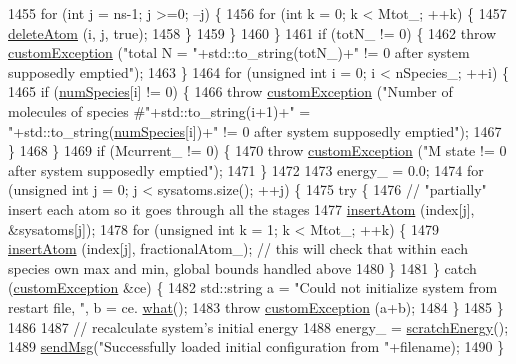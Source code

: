 \begin{DoxyCode}
1455         \textcolor{keywordflow}{for} (\textcolor{keywordtype}{int} j = ns-1; j >=0; --j) \{
1456             \textcolor{keywordflow}{for} (\textcolor{keywordtype}{int} k = 0; k < Mtot\_; ++k) \{
1457                 \hyperlink{classsim_system_acabf4fc5b5b90bba62e1449ddb3646c6}{deleteAtom} (i, j, \textcolor{keyword}{true});
1458             \}
1459         \}
1460     \}
1461     \textcolor{keywordflow}{if} (totN\_ != 0) \{
1462         \textcolor{keywordflow}{throw} \hyperlink{classcustom_exception}{customException} (\textcolor{stringliteral}{"total N = "}+std::to\_string(totN\_)+\textcolor{stringliteral}{" != 0 after system
       supposedly emptied"});
1463     \}
1464     \textcolor{keywordflow}{for} (\textcolor{keywordtype}{unsigned} \textcolor{keywordtype}{int} i = 0; i < nSpecies\_; ++i) \{
1465         \textcolor{keywordflow}{if} (\hyperlink{classsim_system_a9eea865e6dc1cff377b1e79c4d9c23f0}{numSpecies}[i] != 0) \{
1466             \textcolor{keywordflow}{throw} \hyperlink{classcustom_exception}{customException} (\textcolor{stringliteral}{"Number of molecules of species #"}+std::to\_string(i+1)+\textcolor{stringliteral}{"
       = "}+std::to\_string(\hyperlink{classsim_system_a9eea865e6dc1cff377b1e79c4d9c23f0}{numSpecies}[i])+\textcolor{stringliteral}{" != 0 after system supposedly emptied"});
1467         \}
1468     \}
1469     \textcolor{keywordflow}{if} (Mcurrent\_ != 0) \{
1470         \textcolor{keywordflow}{throw} \hyperlink{classcustom_exception}{customException} (\textcolor{stringliteral}{"M state != 0 after system supposedly emptied"});
1471     \}
1472 
1473     energy\_ = 0.0;
1474     \textcolor{keywordflow}{for} (\textcolor{keywordtype}{unsigned} \textcolor{keywordtype}{int} j = 0; j < sysatoms.size(); ++j) \{
1475         \textcolor{keywordflow}{try} \{
1476             \textcolor{comment}{// "partially" insert each atom so it goes through all the stages}
1477             \hyperlink{classsim_system_a0404e9435cc046d19b6bb990678ee069}{insertAtom} (index[j], &sysatoms[j]);
1478             \textcolor{keywordflow}{for} (\textcolor{keywordtype}{unsigned} \textcolor{keywordtype}{int} k = 1; k < Mtot\_; ++k) \{
1479                 \hyperlink{classsim_system_a0404e9435cc046d19b6bb990678ee069}{insertAtom} (index[j], fractionalAtom\_); \textcolor{comment}{// this will check that within each
       species own max and min, global bounds handled above}
1480             \}
1481         \} \textcolor{keywordflow}{catch} (\hyperlink{classcustom_exception}{customException} &ce) \{
1482             std::string a = \textcolor{stringliteral}{"Could not initialize system from restart file, "}, b = ce.
      \hyperlink{classcustom_exception_aeb6ab5848b038adfc68fde86a512f691}{what}();
1483             \textcolor{keywordflow}{throw} \hyperlink{classcustom_exception}{customException} (a+b);
1484         \}
1485     \}
1486 
1487     \textcolor{comment}{// recalculate system's initial energy}
1488     energy\_ = \hyperlink{classsim_system_a51539ed4c3bb4905b32ce428c1c537fe}{scratchEnergy}();
1489     \hyperlink{utilities_8cpp_a08974c73a5b36c28b8ad1ef47fca77b0}{sendMsg}(\textcolor{stringliteral}{"Successfully loaded initial configuration from "}+filename);
1490 \}
\end{DoxyCode}
